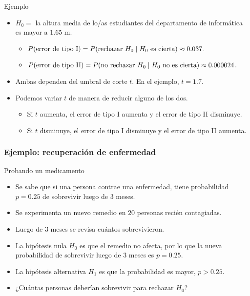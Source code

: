 \documentclass[table]{beamer}
\begin{document}
\begin{frame}
    \begin{exampleblock}{Ejemplo}
        \begin{itemize}
            \item $H_{0} =$ la altura media de lo/as estudiantes del departamento de informática es mayor a $1.65$ m.
                \begin{itemize}
                    \item $\prob{\text{error de tipo I}} = \prob{\text{rechazar } H_{0} \mid H_{0} \text{ es cierta}} \approx 0.037$.
                    \item $\prob{\text{error de tipo II}}
                        = \prob{\text{no rechazar } H_{0} \mid H_{0} \text{ no es cierta}} \approx 0.000024$.
                \end{itemize}
            \item Ambas dependen del umbral de corte $t$. En el ejemplo, $t = 1.7$.
            \item Podemos variar $t$ de manera de reducir alguno de los dos.
                \begin{itemize}
                    \item Si $t$ aumenta, el error de tipo I aumenta y el error de tipo II disminuye.
                    \item Si $t$ disminuye, el error de tipo I disminuye y el error de tipo II aumenta.
                \end{itemize}
        \end{itemize}
    \end{exampleblock}
\end{frame}

\begin{frame}
    \frametitle{Ejemplo: recuperación de enfermedad}
    \begin{exampleblock}{Probando un medicamento}
        \begin{itemize}
            \item Se sabe que si una persona contrae una enfermedad, tiene probabilidad $p = 0.25$ de sobrevivir luego de $3$ meses.
            \item Se experimenta un nuevo remedio en $20$ personas recién contagiadas.
            \item Luego de $3$ meses se revisa cuántos sobrevivieron.
            \item La hipótesis nula $H_{0}$ es que el remedio no afecta, por lo que la nueva probabilidad de sobrevivir luego de $3$ meses es $p = 0.25$.
            \item La hipótesis alternativa $H_{1}$ es que la probabilidad es mayor, $p > 0.25$.
            \item ¿Cuántas personas deberían sobrevivir para rechazar $H_{0}$?
        \end{itemize}
    \end{exampleblock}
\end{frame}
\end{document}
